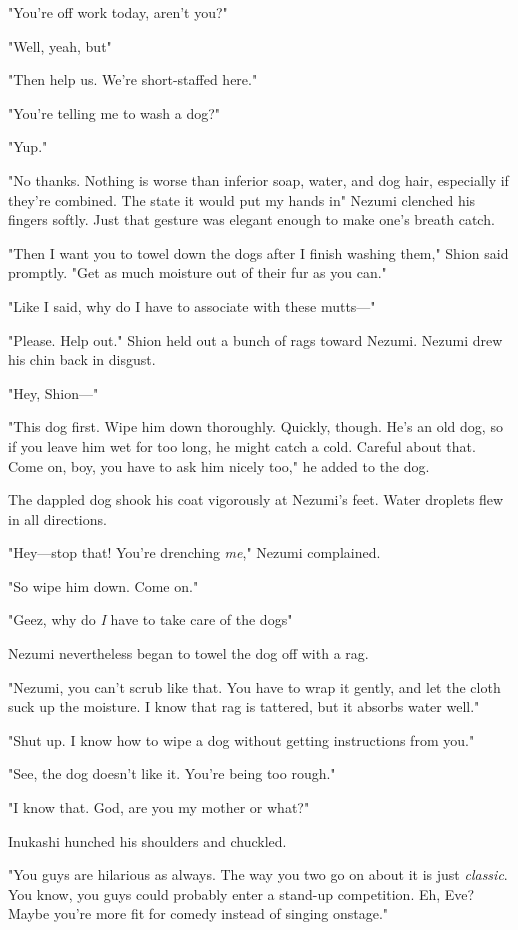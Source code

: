 "You're off work today, aren't you?"

"Well, yeah, but\el "

"Then help us. We're short-staffed here."

"You're telling me to wash a dog?"

"Yup."

"No thanks. Nothing is worse than inferior soap, water, and dog hair,
especially if they're combined. The state it would put my hands in\el "
Nezumi clenched his fingers softly. Just that gesture was elegant enough
to make one's breath catch.

"Then I want you to towel down the dogs after I finish washing them,"
Shion said promptly. "Get as much moisture out of their fur as you can."

"Like I said, why do I have to associate with these mutts---"

"Please. Help out." Shion held out a bunch of rags toward Nezumi. Nezumi
drew his chin back in disgust.

"Hey, Shion---"

"This dog first. Wipe him down thoroughly. Quickly, though. He's an old
dog, so if you leave him wet for too long, he might catch a cold.
Careful about that. Come on, boy, you have to ask him nicely too," he
added to the dog.

The dappled dog shook his coat vigorously at Nezumi's feet. Water
droplets flew in all directions.

"Hey---stop that! You're drenching \emph{me}," Nezumi complained.

"So wipe him down. Come on."

"Geez, why do \emph{I} have to take care of the dogs\el "

Nezumi nevertheless began to towel the dog off with a rag.

"Nezumi, you can't scrub like that. You have to wrap it gently, and let
the cloth suck up the moisture. I know that rag is tattered, but it
absorbs water well."

"Shut up. I know how to wipe a dog without getting instructions from
you."

"See, the dog doesn't like it. You're being too rough."

"I know that. God, are you my mother or what?"

Inukashi hunched his shoulders and chuckled.

"You guys are hilarious as always. The way you two go on about it is
just \emph{classic}. You know, you guys could probably enter a stand-up
competition. Eh, Eve? Maybe you're more fit for comedy instead of
singing onstage."


